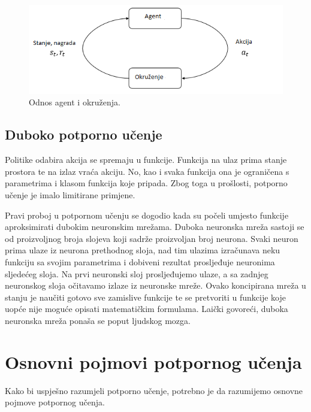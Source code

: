 \documentclass[times,utf8,diplomski]{fer}
\begin{document}
\begin{figure}[ht!]
	\centering
	\includegraphics[width=\columnwidth]{img/agent-environment.png}
	\caption{Odnos agent i okruženja.\protect\footnotemark}
	\label{fig:agenta}
\end{figure}



\subsection{Duboko potporno učenje}

Politike odabira akcija se spremaju u funkcije. Funkcija na ulaz prima stanje prostora te na izlaz vraća akciju. No, kao i svaka funkcija ona je ograničena s parametrima i klasom funkcija koje pripada. Zbog toga u prošlosti, potporno učenje je imalo limitirane primjene.

Pravi proboj u potpornom učenju se dogodio kada su počeli umjesto funkcije aproksimirati dubokim neuronskim mrežama. Duboka neuronska mreža sastoji se od proizvoljnog broja slojeva koji sadrže proizvoljan broj neurona. Svaki neuron prima ulaze iz neurona prethodnog sloja, nad tim ulazima izračunava neku funkciju sa svojim parametrima i dobiveni rezultat prosljeđuje neuronima sljedećeg sloja. Na prvi neuronski sloj prosljeđujemo ulaze, a sa zadnjeg neuronskog sloja očitavamo izlaze iz neuronske mreže. Ovako koncipirana mreža u stanju je naučiti gotovo sve zamislive funkcije te se pretvoriti u funkcije koje uopće nije moguće opisati matematičkim formulama. Laički govoreći, duboka neuronska mreža ponaša se poput ljudskog mozga.



\section{Osnovni pojmovi potpornog učenja}

Kako bi uspješno razumjeli potporno učenje, potrebno je da razumijemo osnovne pojmove potpornog učenja. \citep{SpinningUp2018}
\end{document}
